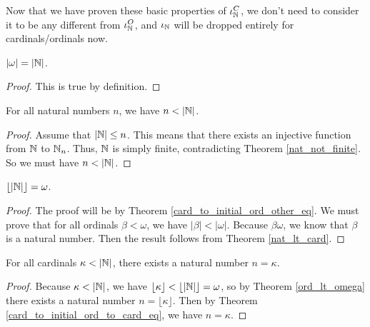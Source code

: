 \documentclass[../../math.tex]{subfiles}
\begin{document}
Now that we have proven these basic properties of $\iota_{\mathbb{N}}^C$, we don't need to
consider it to be any different from $\iota_{\mathbb{N}}^O$, and $\iota_{\mathbb{N}}$ will be dropped entirely
for cardinals/ordinals now.

\begin{theorem} \label{card_omega}
    $|\omega| = |\mathbb{N}|$.
\end{theorem}
\begin{proof}
    This is true by definition.
\end{proof}

\begin{theorem} \label{nat_lt_card}
    For all natural numbers $n$, we have $n < |\mathbb{N}|$.
\end{theorem}
\begin{proof}
    Assume that $|\mathbb{N}| \leq n$.  This means that there exists an injective
    function from $\mathbb{N}$ to $\mathbb{N}_n$.  Thus, $\mathbb{N}$ is simply finite, contradicting
    Theorem \ref{nat_not_finite}.  So we must have $n < |\mathbb{N}|$.
\end{proof}

\begin{theorem} \label{card_omega_initial}
    $\lfloor | \mathbb{N} | \rfloor = \omega$.
\end{theorem}
\begin{proof}
    The proof will be by Theorem \ref{card_to_initial_ord_other_eq}.  We must
    prove that for all ordinals $\beta < \omega$, we have $|\beta| < |\omega|$.
    Because $\beta \omega$, we know that $\beta$ is a natural number.  Then the
    result follows from Theorem \ref{nat_lt_card}.
\end{proof}

\begin{theorem} \label{card_lt_nat}
    For all cardinals $\kappa < |\mathbb{N}|$, there exists a natural number $n =
    \kappa$.
\end{theorem}
\begin{proof}
    Because $\kappa < |\mathbb{N}|$, we have $\lfloor \kappa \rfloor < \lfloor |\mathbb{N}|
    \rfloor = \omega$, so by Theorem \ref{ord_lt_omega} there exists a natural
    number $n = \lfloor \kappa \rfloor$.  Then by Theorem
    \ref{card_to_initial_ord_to_card_eq}, we have $n = \kappa$.
\end{proof}
\end{document}
